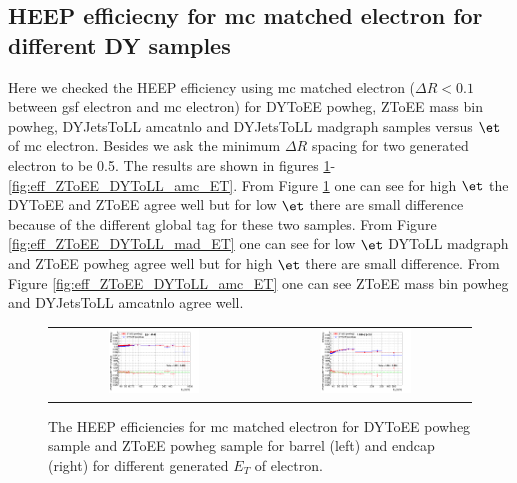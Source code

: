 \clearpage
\subsection{HEEP efficiecny for mc matched electron for different DY samples}
\label{AppHEEPsf_mc_eff_2016}

Here we checked the HEEP efficiency using mc matched electron ($\Delta R<0.1$ between gsf electron and mc electron) for DYToEE powheg, ZToEE mass bin powheg, DYJetsToLL amcatnlo and DYJetsToLL madgraph samples versus $\et$ of mc electron. Besides we ask the minimum $\Delta R$ spacing for two generated electron to be 0.5. The results are shown in figures \ref{fig:eff_ZToEE_DYToEE_ET}-\ref{fig:eff_ZToEE_DYToLL_amc_ET}. From Figure \ref{fig:eff_ZToEE_DYToEE_ET} one can see for high $\et$ the DYToEE and ZToEE agree well but for low $\et$ there are small difference because of the different global tag for these two samples. From Figure \ref{fig:eff_ZToEE_DYToLL_mad_ET} one can see for low $\et$ DYToLL madgraph and ZToEE powheg agree well but for high $\et$ there are small difference. From Figure \ref{fig:eff_ZToEE_DYToLL_amc_ET} one can see ZToEE mass bin powheg and DYJetsToLL amcatnlo agree well.


\begin{figure}[bh]
  \begin{center}
    \begin{tabular}{cc}
      \includegraphics[width=0.45\textwidth]{figures/Zprime/2016/ScaleFactor/SameSign/ZToEE_DYToEE/compare_divide_Et_barrel_pass_by_Et_barrel_all.png} &
      \includegraphics[width=0.45\textwidth]{figures/Zprime/2016/ScaleFactor/SameSign/ZToEE_DYToEE/compare_divide_Et_endcap_pass_by_Et_endcap_all.png} \\
    \end{tabular}
    \caption{The HEEP efficiencies for mc matched electron for DYToEE powheg sample and ZToEE powheg sample for barrel (left) and endcap (right) for different generated $E_T$ of electron.}
    \label{fig:eff_ZToEE_DYToEE_ET}
  \end{center}
\end{figure}

